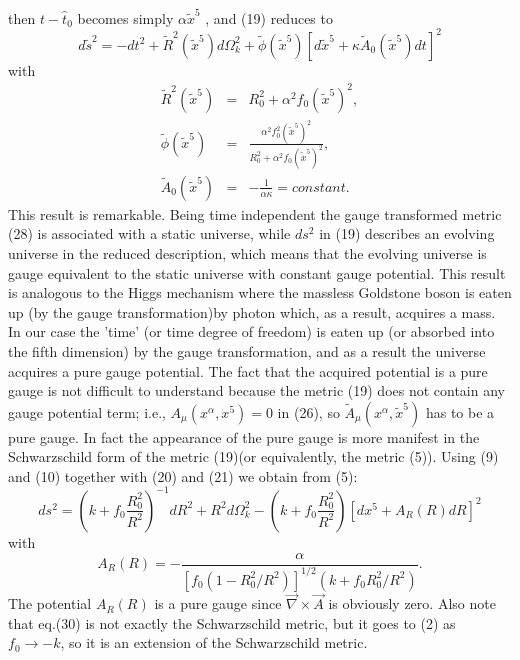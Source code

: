 \documentclass[a4paper,12pt]{article}
\begin{document}
  then $t - \hat{t}_0$ becomes simply $\alpha \tilde{x}^5$ , and 
(19)
  reduces to
  \begin{equation}
  d\tilde{s}^2 =-dt^2 + \tilde{R}^2(\tilde{x}^5) d\Omega^2_k +
  \tilde{\phi}(\tilde{x}^5)[d\tilde{x}^5 + \kappa \tilde{A}_0(\tilde
{x}^5)dt]^2
  \end{equation}
  with
  \begin{eqnarray}
  \tilde{R}^2(\tilde{x}^5)&=& R^2_0 + \alpha^2 f_0(\tilde{x}^5)^2
  , \nonumber \\
  \tilde{\phi}(\tilde{x}^5)&=& \frac{\alpha^2 f^2_0 (\tilde{x}^5)^2}
   {R^2_0 + \alpha^2 f_0 (\tilde{x}^5)^2} ,
    \\
\tilde{A}_0(\tilde{x}^5)&=& -\frac{1}{\alpha \kappa}
 = constant.   \nonumber
\end{eqnarray}
This result is remarkable. Being time independent the gauge
transformed metric (28) is associated with a static universe,
while $ds^2$ in (19) describes an evolving universe in the reduced
description, which means that the evolving universe is gauge
equivalent to the static universe with constant gauge potential.
This result is analogous to the Higgs mechanism where the massless
Goldstone boson is eaten up (by the gauge transformation)by photon
which, as a result, acquires a mass. In our case the 'time' (or
time degree of freedom) is eaten up (or absorbed into the fifth
dimension) by the gauge transformation, and as a result the
universe acquires a pure gauge potential. The fact that the
acquired potential is a pure gauge is not difficult to understand
because the metric (19) does not contain any gauge potential term;
i.e., $A_{\mu}(x^{\alpha},x^5) =0$ in (26), so
$\tilde{A}_{\mu}(x^{\alpha},\tilde{x}^5)$ has to be a pure gauge.
In fact the appearance of the pure gauge is more manifest in the
Schwarzschild form of the metric (19)(or equivalently, the metric
(5)). Using (9) and (10) together with (20) and (21) we obtain
from (5):
\begin{equation}
ds^2=(k +f_0\frac{R^2_0}{R^2})^{-1}dR^2 + R^2d\Omega^2_k
-(k+f_0\frac{R^2_0}{R^2})[dx^5 +A_R(R)dR]^2
\end{equation}
with
\begin{equation}
A_R (R)=-\frac{\alpha}{[f_0(1-R^2_0/R^2)]^{1/2}(k+f_0 R^2_0/R^2)}.
\end{equation}
The potential $A_R(R)$ is a pure gauge since
$\overrightarrow{\nabla} \times \overrightarrow{A}$ is obviously
zero. Also note that eq.(30) is not exactly the Schwarzschild
metric, but it goes to (2) as $f_0 \rightarrow -k$, so it is an
extension of the Schwarzschild metric.
\end{document}
